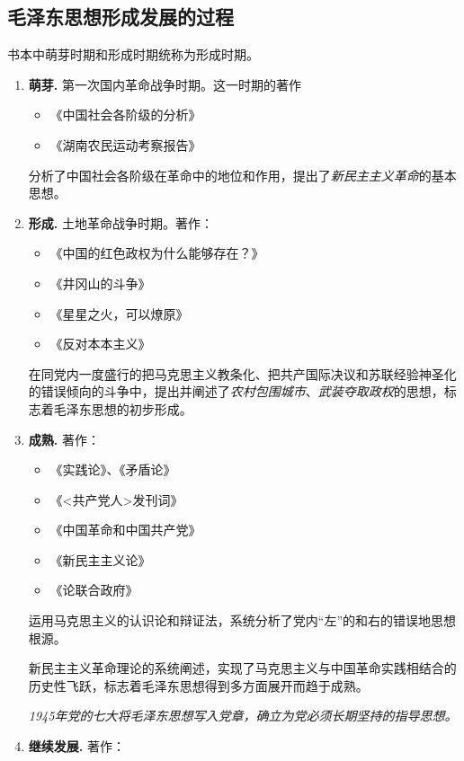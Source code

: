     \subsection{毛泽东思想形成发展的过程}
    书本中萌芽时期和形成时期统称为形成时期。
    \begin{enumerate}
        \item \textbf{萌芽.} 第一次国内革命战争时期。这一时期的著作
        \begin{itemize}
            \item 《中国社会各阶级的分析》
            \item 《湖南农民运动考察报告》
        \end{itemize}
        分析了中国社会各阶级在革命中的地位和作用，提出了\emph{新民主主义革命}的基本思想。
        \item \textbf{形成.} 土地革命战争时期。著作：
        \begin{itemize}
            \item 《中国的红色政权为什么能够存在？》
            \item 《井冈山的斗争》
            \item 《星星之火，可以燎原》
            \item 《反对本本主义》
        \end{itemize}
        \par 在同党内一度盛行的把马克思主义教条化、把共产国际决议和苏联经验神圣化的错误倾向的斗争中，提出并阐述了\emph{农村包围城市}、\emph{武装夺取政权}的思想，标志着毛泽东思想的初步形成。
        \item \textbf{成熟.} 著作：
        \begin{itemize}
            \item 《实践论》、《矛盾论》
            \item 《<共产党人>发刊词》
            \item 《中国革命和中国共产党》
            \item 《新民主主义论》
            \item 《论联合政府》
        \end{itemize}
        \par 运用马克思主义的认识论和辩证法，系统分析了党内“左”的和右的错误地思想根源。
        \par 新民主主义革命理论的系统阐述，实现了马克思主义与中国革命实践相结合的历史性飞跃，标志着毛泽东思想得到多方面展开而趋于成熟。
        \par \emph{1945年党的七大将毛泽东思想写入党章，确立为党必须长期坚持的指导思想。}
        \item \textbf{继续发展.} 著作：

\end{enumerate}
